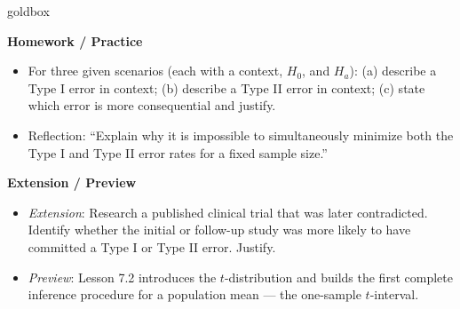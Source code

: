 \documentclass[10pt]{article}
\begin{document}
\begin{skillbox}{goldbox}
\begin{minipage}[t]{0.48\linewidth}
    \textbf{Homework / Practice}
    \begin{itemize}
        \item For three given scenarios (each with a context, $H_0$, and $H_a$):
              (a) describe a Type I error in context; (b) describe a Type II error
              in context; (c) state which error is more consequential and justify.
        \item Reflection: ``Explain why it is impossible to simultaneously minimize
              both the Type I and Type II error rates for a fixed sample size.''
    \end{itemize}
\end{minipage}
\hfill
\begin{minipage}[t]{0.48\linewidth}
    \textbf{Extension / Preview}
    \begin{itemize}
        \item \textit{Extension}: Research a published clinical trial that was later
              contradicted. Identify whether the initial or follow-up study was more
              likely to have committed a Type I or Type II error. Justify.
        \item \textit{Preview}: Lesson 7.2 introduces the $t$-distribution and builds
              the first complete inference procedure for a population mean --- the
              one-sample $t$-interval.
    \end{itemize}
\end{minipage}
\end{skillbox}
\end{document}

